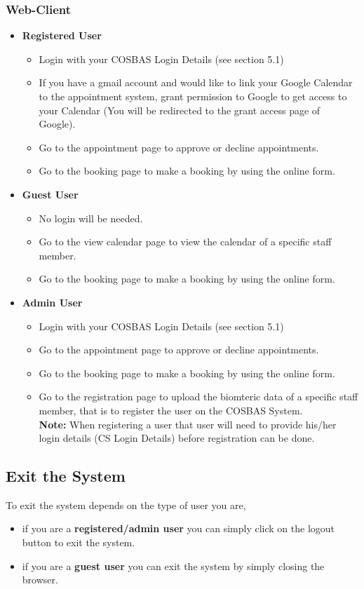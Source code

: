 \subsubsection{Web-Client}
	\begin{itemize}
		\item{\textbf{Registered User}} 
			\begin{itemize}
				\item{Login with your COSBAS Login Details (see section 5.1)} 
				\item{If you have a gmail account and would like to link your Google Calendar to the appointment system, grant permission to Google to get access to your Calendar (You will be redirected to the grant access page of Google).}
				\item{Go to the appointment page to approve or decline appointments.}
				\item{Go to the booking page to make a booking by using the online form.}
			\end{itemize}

		\item{\textbf{Guest User} }
			\begin{itemize}
				\item{No login will be needed.}
				\item{Go to the view calendar page to view the calendar of a specific staff member.}
				\item{Go to the booking page to make a booking by using the online form.}
			\end{itemize}

		\item{\textbf{Admin User} }
			\begin{itemize}
				\item{Login with your COSBAS Login Details (see section 5.1)} 
				\item{Go to the appointment page to approve or decline appointments.}
				\item{Go to the booking page to make a booking by using the online form.}
				\item{Go to the registration page to upload the biomteric data of a specific staff member, that is to register the user on the COSBAS System.\\
\textbf{Note:} When registering a user that user will need to provide his/her login details (CS Login Details) before registration can be done.}
			\end{itemize}
	\end{itemize}

\subsection{Exit the System}
To exit the system depends on the type of user you are,
	\begin{itemize}
		\item{if you are a \textbf{registered/admin user} you can simply click on the logout button to exit the system.} 
		\item{if you are a \textbf{guest user} you can exit the system by simply closing the browser.}
	\end{itemize}


